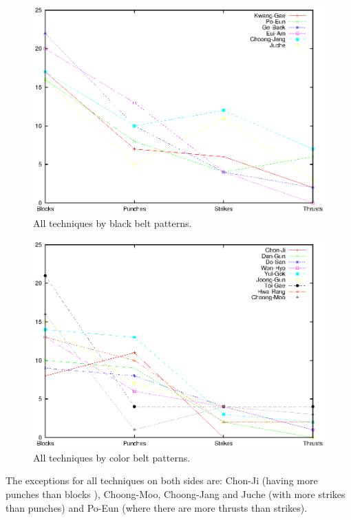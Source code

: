 \documentclass[10pt,twocolumn,a4paper]{article}
\begin{document}
  \begin{figure}
    \includegraphics[scale=0.65]{data/gnuplot/eps/patterns_black_all}
    \caption{All techniques by black belt patterns.}
    \label{fig:patterns_black_all}
  \end{figure}

  \begin{figure}
    \includegraphics[scale=0.65]{data/gnuplot/eps/patterns_color_all}
    \caption{All techniques by color belt patterns.}
    \label{fig:patterns_color_all}
  \end{figure}

  The exceptions for all techniques on both sides are: Chon-Ji (having more
  punches than blocks ), Choong-Moo, Choong-Jang and Juche (with more strikes
  than punches) and Po-Eun (where there are more thrusts than strikes).
\end{document}
